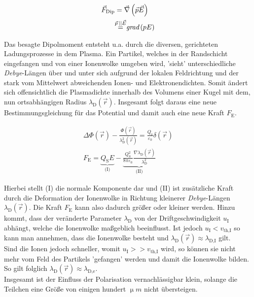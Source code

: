 \documentclass[numbers=noenddot,a4paper,notitlepage,twoside,BCOR15mm]{scrbook}
\newcommand{\ix}[1]{_\text{#1}}
\newcommand{\tilt}[1]{\textit{#1}}
\newcommand{\grad}[1]{\textit{grad}\left(#1\right)}
\begin{document}
				\begin{align}
					\centering
					\vec{F}\ix{Dip}&=\vec{\nabla}\left(\vec{p}\vec{E}\right)\\
					&{\overset{\vec{p}\,||\vec{E}}{=}}\grad{pE} \nonumber
				\end{align}

			Das besagte Dipolmoment entsteht u.a. durch die diversen, gerichteten Ladungsprozesse in dem Plasma. Ein Partikel, welches in der Randschicht eingefangen und von einer Ionenwolke umgeben wird, 'sieht' unterschiedliche \tilt{Debye}-Längen über und unter sich aufgrund der lokalen Feldrichtung und der stark vom Mittelwert abweichenden Ionen- und Elektronendichten. Somit ändert sich offensichtlich die Plasmadichte innerhalb des Volumens einer Kugel mit dem, nun ortsabhängigen Radius $\lambda\ix{D}\left(\vec{r}\right)$. Insgesamt folgt daraus eine neue Bestimmungsgleichung für das Potential und damit auch eine neue Kraft $F\ix{E}$.

				\begin{align}
					\Delta \Phi\left(\vec{r}\right)-\frac{\Phi\left(\vec{r}\right)}{\lambda\ix{D}^2\left(\vec{r}\right)}=\frac{Q\ix{s}}{\varepsilon\ix{0}}\delta\left(\vec{r}\right) \\
					F\ix{E}=\underbrace{Q\ix{S}E}_{\text{(I)}}-\underbrace{\frac{Q\ix{S}^2}{8\pi\varepsilon\ix{0}}\frac{\nabla\lambda\ix{D}\left(\vec{r}\right)}{\lambda\ix{D}^2}}_{\text{(II)}}
				\end{align}

			Hierbei stellt (I) die normale Komponente dar und (II) ist zusätzliche Kraft durch die Deformation der Ionenwolke in Richtung kleinerer \tilt{Debye}-Längen $\lambda\ix{D}\left(\vec{r}\right)$. Die Kraft $F\ix{E}$ kann also dadurch größer oder kleiner werden. Hinzu kommt, dass der veränderte Parameter $\lambda\ix{D}$ von der Driftgeschwindigkeit $u\ix{I}$ abhängt, welche die Ionenwolke maßgeblich beeinflusst. Ist jedoch $u\ix{I}<v\ix{th,I}$ so kann man annehmen, dass die Ionenwolke besteht und $\lambda\ix{D}\left(\vec{r}\right)\approx\lambda\ix{D,I}$ gilt.\\
			Sind die Ionen jedoch schneller, womit $u\ix{I}>>v\ix{th,I}$ wird, so können sie nicht mehr vom Feld des Partikels 'gefangen' werden und damit die Ionenwolke bilden. So gilt folglich $\lambda\ix{D}\left(\vec{r}\right)\approx\lambda\ix{D,e}$.\\
			Insgesamt ist der Einfluss der Polarisation vernachlässigbar klein, solange die Teilchen eine Größe von einigen hundert $\unit{\upmu m}$ nicht übersteigen.
\end{document}
